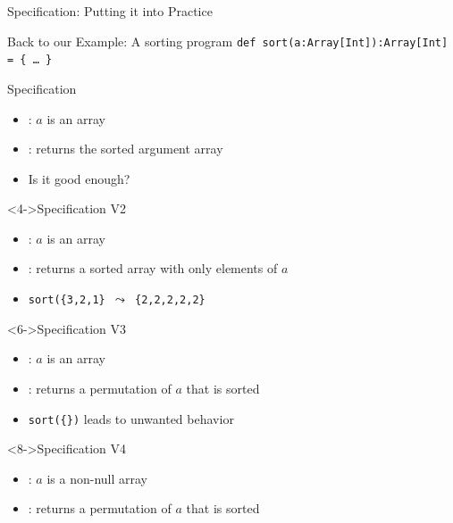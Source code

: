 \begin{frame}[squeeze]{Specification: Putting it into Practice}
  \begin{block}{Back to our Example: A sorting program}\smallskip
    \texttt{def sort(a:Array[Int]):Array[Int] = \{ \ldots\ \}}
  \end{block}\vspace{-.3\baselineskip}
  \begin{block}{Specification }
    \begin{itemize}\vspace{-.2\baselineskip}
    \item {}: $a$ is an array
    \item {}: returns the sorted argument array
    \item<2-> \alert{Is it good enough?}
    \end{itemize}
  \end{block}\vspace{-.8\baselineskip}
  \begin{block}<4->{Specification V2}
    \begin{itemize}\vspace{-.2\baselineskip}
    \item {}: $a$ is an array
    \item {}: returns a sorted array \alert{with only
        elements} of $a$
    \item<5->[\Frownie] \texttt{sort(\{3,2,1\} $\leadsto$ \{2,2,2,2,2\}}
    \end{itemize}
  \end{block}\vspace{-.8\baselineskip}
  \begin{block}<6->{Specification V3}
    \begin{itemize}\vspace{-.2\baselineskip}
    \item {}: $a$ is an array
    \item {}: returns a \alert{permutation} of $a$ that
      is sorted
    \item<7->[\Frownie] \texttt{sort(\{\})} leads to unwanted behavior
    \end{itemize}
  \end{block}\vspace{-.8\baselineskip}
  \begin{block}<8->{Specification V4}
    \begin{itemize}\vspace{-.2\baselineskip}
    \item {}: $a$ is a \alert{non-null} array
    \item {}: returns a permutation of $a$ that
      is sorted
    \end{itemize}
  \end{block}
\end{frame}
